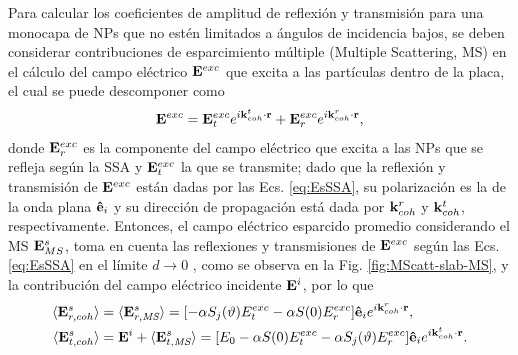 Para calcular los coeficientes de amplitud de reflexión y transmisión para una monocapa de NPs que no estén limitados a ángulos de incidencia bajos, se deben considerar contribuciones de esparcimiento múltiple (Multiple Scattering, MS) en el cálculo del campo eléctrico $\vb{E}^{exc}$  que excita a las partículas dentro de la placa, el cual se puede descomponer como 
	\begin{align}
	\vb{E}^{exc} = \vb{E}^{exc}_{t} e^{i\vb{k}^t_{coh}\cdot\vb{r}}+
					\vb{E}^{exc}_{r} e^{i\vb{k}^r_{coh}\cdot\vb{r}},
	\end{align}
donde  $\vb{E}^{exc}_r$ es la componente del campo eléctrico que excita a las NPs que se refleja según la SSA y $\vb{E}^{exc}_{t}$ la que se transmite; dado que la reflexión y transmisión de $\vb{E}^{exc}$ están dadas por las Ecs. \eqref{eq:EsSSA}, su polarización es la de la onda plana $\vu{e}_i$ y su dirección de propagación está dada por $\vb{k}^r_{coh}$ y $\vb{k}^t_{coh}$, respectivamente. Entonces, el campo eléctrico esparcido promedio considerando el MS $\vb{E}^s_{MS}$, toma en cuenta  las reflexiones y transmisiones de $\vb{E}^{exc}$ según las Ecs. \eqref{eq:EsSSA} en el límite $d\to 0$ \cite{gutierrez2012overview}, como se observa en la Fig. \ref{fig:MScatt-slab-MS}, y la contribución del campo eléctrico incidente $\vb{E}^i$, por lo que  \cite{reyes2018analytical}
%
	\begin{subequations}\begin{align}
		\langle \vb{E}^s_{r,coh}\rangle & =	\langle \vb{E}^s_{r,\textit{MS}}\rangle
					= \qty[-\alpha S_j(\vartheta)E^{exc}_t -\alpha S(0)E^{exc}_r
					]\vu{e}_i e^{i\vb{k}^r_{coh}\cdot\vb{r}},\\
		\langle \vb{E}^s_{t,coh}\rangle & =\vb{E}^i+\langle\vb{E}^s_{t,\textit{MS}}\rangle
					= \qty[E_0 -\alpha S(0)E^{exc}_t 
					-\alpha	 S_j(\vartheta)E^{exc}_r
					]\vu{e}_i e^{i\vb{k}^t_{coh}\cdot\vb{r}}.
	\end{align} \label{eqs:EsMS}\end{subequations} \vspace*{-2em}

